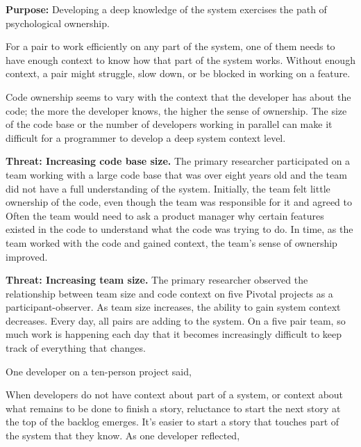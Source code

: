 \textbf{Purpose:} Developing a deep knowledge of the system exercises the  path of psychological ownership.

For a pair to work efficiently on any part of the system, one of them needs to have enough context to know how that part of the system works. Without enough context, a pair might struggle, slow down, or be blocked in working on a feature.

Code ownership seems to vary with the context that the developer has about the code; the more the developer knows, the higher the sense of ownership. The size of the code base or the number of developers working in parallel can make it difficult for a programmer to develop a deep system context level.

\textbf{Threat: Increasing code base size.} The primary researcher participated on a team working with a large code base that was over eight years old and the team did not have a full understanding of the system. Initially, the team felt little ownership of the code, even though the team was responsible for it and agreed to  Often the team would need to ask a product manager why certain features existed in the code to understand what the code was trying to do. In time, as the team worked with the code and gained context, the team's sense of ownership improved.

\textbf{Threat: Increasing team size.} The primary researcher observed the relationship between team size and code context on five Pivotal projects as a participant-observer. As team size increases, the ability to gain system context decreases. Every day, all pairs are adding to the system. On a five pair team, so much work is happening each day that it becomes increasingly difficult to keep track of everything that changes.

One developer on a ten-person project said, 

When developers do not have context about part of a system, or context about what remains to be done to finish a story, reluctance to start the next story at the top of the backlog emerges. It's easier to start a story that touches part of the system that they know. As one developer reflected, 

